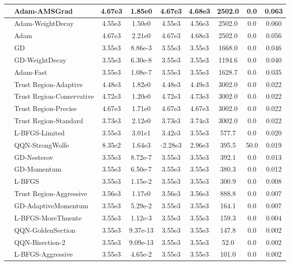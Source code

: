 \documentclass[10pt]{article}
\begin{document}
\begin{longtable}{|l|l|c|c|c|c|c|c|c|}
\hline
 & Adam-AMSGrad & 4.67e3 & 1.85e0 & 4.67e3 & 4.68e3 & 2502.0 & 0.0 & 0.063 \\
\hline
 & Adam-WeightDecay & 4.55e3 & 1.50e0 & 4.55e3 & 4.56e3 & 2502.0 & 0.0 & 0.060 \\
\hline
 & Adam & 4.67e3 & 2.21e0 & 4.67e3 & 4.68e3 & 2502.0 & 0.0 & 0.056 \\
\hline
 & GD & 3.55e3 & 8.86e-3 & 3.55e3 & 3.55e3 & 1668.0 & 0.0 & 0.046 \\
\hline
 & GD-WeightDecay & 3.55e3 & 6.30e-8 & 3.55e3 & 3.55e3 & 1194.6 & 0.0 & 0.040 \\
\hline
 & Adam-Fast & 3.55e3 & 1.08e-7 & 3.55e3 & 3.55e3 & 1628.7 & 0.0 & 0.035 \\
\hline
 & Trust Region-Adaptive & 4.48e3 & 1.82e0 & 4.48e3 & 4.49e3 & 3002.0 & 0.0 & 0.022 \\
\hline
 & Trust Region-Conservative & 4.72e3 & 1.20e0 & 4.72e3 & 4.73e3 & 3002.0 & 0.0 & 0.022 \\
\hline
 & Trust Region-Precise & 4.67e3 & 1.71e0 & 4.67e3 & 4.67e3 & 3002.0 & 0.0 & 0.022 \\
\hline
 & Trust Region-Standard & 3.73e3 & 2.12e0 & 3.73e3 & 3.74e3 & 3002.0 & 0.0 & 0.022 \\
\hline
 & L-BFGS-Limited & 3.55e3 & 3.01e1 & 3.42e3 & 3.55e3 & 577.7 & 0.0 & 0.020 \\
\hline
 & QQN-StrongWolfe & 8.35e2 & 1.64e3 & -2.28e3 & 2.96e3 & 395.5 & 50.0 & 0.019 \\
\hline
 & GD-Nesterov & 3.55e3 & 8.72e-7 & 3.55e3 & 3.55e3 & 392.1 & 0.0 & 0.013 \\
\hline
 & GD-Momentum & 3.55e3 & 6.50e-7 & 3.55e3 & 3.55e3 & 380.3 & 0.0 & 0.012 \\
\hline
 & L-BFGS & 3.55e3 & 1.15e-2 & 3.55e3 & 3.55e3 & 300.9 & 0.0 & 0.008 \\
\hline
 & Trust Region-Aggressive & 3.56e3 & 1.17e0 & 3.56e3 & 3.56e3 & 888.8 & 0.0 & 0.007 \\
\hline
 & GD-AdaptiveMomentum & 3.55e3 & 5.29e-2 & 3.55e3 & 3.55e3 & 164.1 & 0.0 & 0.007 \\
\hline
 & L-BFGS-MoreThuente & 3.55e3 & 1.12e-3 & 3.55e3 & 3.55e3 & 159.3 & 0.0 & 0.004 \\
\hline
 & QQN-GoldenSection & 3.55e3 & 9.37e-13 & 3.55e3 & 3.55e3 & 147.8 & 0.0 & 0.002 \\
\hline
 & QQN-Bisection-2 & 3.55e3 & 9.09e-13 & 3.55e3 & 3.55e3 & 52.0 & 0.0 & 0.002 \\
\hline
 & L-BFGS-Aggressive & 3.55e3 & 4.65e-2 & 3.55e3 & 3.55e3 & 101.0 & 0.0 & 0.002 \\

\end{longtable}
\end{document}
